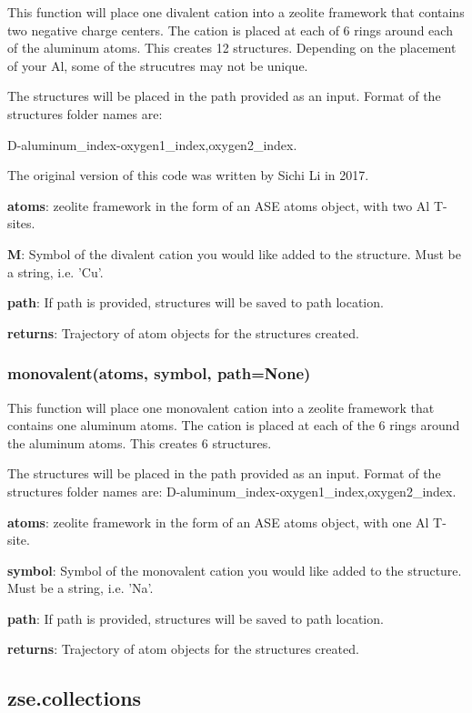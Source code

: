 \documentclass[11pt]{article}
\begin{document}
This function will place one divalent cation into a zeolite framework that contains two negative charge centers. The cation is placed at each of 6 rings around each of the aluminum atoms. This creates 12 structures. Depending on the placement of your Al, some of the strucutres may not be unique.

The structures will be placed in the path provided as an input. Format of the structures folder names are:

D-aluminum\_index-oxygen1\_index,oxygen2\_index.

The original version of this code was written by Sichi Li in 2017.

\textbf{atoms}: zeolite framework in the form of an ASE atoms object, with two Al T-sites.

\textbf{M}: Symbol of the divalent cation you would like added to the structure. Must be a string, i.e. 'Cu'.

\textbf{path}: If path is provided, structures will be saved to path location. 

\textbf{returns}: Trajectory of atom objects for the structures created.

\subsubsection{monovalent(atoms, symbol, path=None)}
\label{sec:orgec7880e}

This function will place one monovalent cation into a zeolite framework that contains one aluminum atoms. The cation is placed at each of the 6 rings around the aluminum atoms. This creates 6 structures.

The structures will be placed in the path provided as an input. Format of the structures folder names are: D-aluminum\_index-oxygen1\_index,oxygen2\_index.

\textbf{atoms}: zeolite framework in the form of an ASE atoms object, with one Al T-site.

\textbf{symbol}: Symbol of the monovalent cation you would like added to the structure. Must be a string, i.e. 'Na'.

\textbf{path}: If path is provided, structures will be saved to path location.

\textbf{returns}: Trajectory of atom objects for the structures created.
\subsection{zse.collections}
\label{sec:org74ce673}
\end{document}
